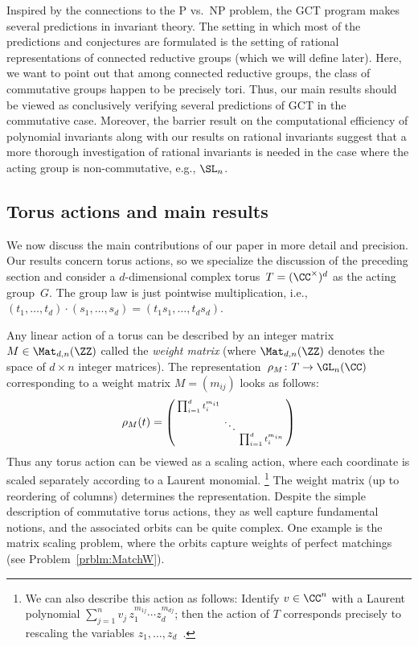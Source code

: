 Inspired by the connections to the P vs.~NP problem, the GCT program makes several predictions in invariant theory.
The setting in which most of the predictions and conjectures are formulated is the setting of rational representations of connected reductive groups
(which we will define later). Here, we want to point out that among connected reductive groups, the class of commutative groups happen to be precisely tori.
Thus, our main results should be viewed as conclusively verifying several predictions of GCT in the commutative case.
Moreover, the barrier result on the computational efficiency of polynomial invariants \cite{GIMOWW} along with our results on rational invariants suggest
that a more thorough investigation of rational invariants is needed in the case where the acting group is non-commutative, e.g., $\SL_n$.

%

%
%
%
%

%
\subsection{Torus actions and main results} \label{subsec:intro-main-results}
%
We now discuss the main contributions of our paper in more detail and precision.
Our results concern torus actions, so we specialize the discussion of the preceding section and consider a $d$-dimensional
complex torus~$T = (\CC^\times)^d$ as the acting group~$G$.
The group law is just pointwise multiplication, i.e.,
$(t_1,\dots,t_d) \cdot (s_1,\dots,s_d) = (t_1s_1,\dots,t_ds_d)$.

Any linear action of a torus can be described by an integer matrix $M \in \Mat_{d,n}(\ZZ)$ called the \emph{weight matrix}
(where $\Mat_{d,n}(\ZZ)$ denotes the space of $d \times n$ integer matrices).
The representation~$\rho_M \colon T \rightarrow \GL_n(\CC)$ corresponding to a weight matrix $M=(m_{ij})$ looks as follows:
\begin{align}\label{eq:toract}
  \rho_M(t) = \begin{psmallmatrix} \prod_{i=1}^d t_i^{m_{i1}} & & \\ & \ddots & \\ & & \prod_{i=1}^d t_i^{m_{in}} \end{psmallmatrix}
\end{align}
Thus any torus action can be viewed as a scaling action, where each coordinate is scaled separately according to a Laurent monomial.
\footnote{
We can also describe this action as follows:
Identify $v\in\CC^n$ with a Laurent polynomial $\sum_{j=1}^n v_j \, z_1^{m_{1j}} \cdots z_d^{m_{dj}}$;
then the action of $T$ corresponds precisely to rescaling the variables $z_1,\dots,z_d$~\cite{gurvits2004combinatorial}.}
The weight matrix (up to reordering of columns) determines the representation. 
%
Despite the simple description of commutative torus actions, they as well capture fundamental notions, and the associated orbits can be quite complex.
One example is the matrix scaling problem, where the orbits capture weights of perfect matchings (see Problem~\ref{prblm:MatchW}).
%


